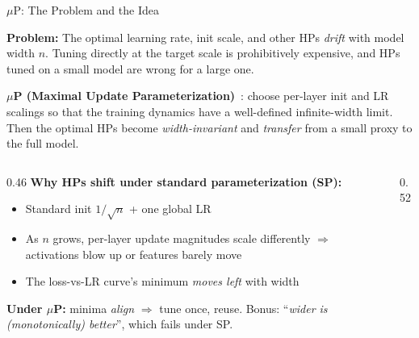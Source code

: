 \begin{frame}{$\mu$P: The Problem and the Idea}

  \textbf{Problem:} The optimal learning rate, init scale, and other HPs \emph{drift} with model width $n$. Tuning directly at the target scale is prohibitively expensive, and HPs tuned on a small model are wrong for a large one.

  \vspace{0.2em}
  \textbf{$\mu$P (Maximal Update Parameterization)}~\cite{yang2022muP}: choose per-layer init and LR scalings so that the training dynamics have a well-defined infinite-width limit. Then the optimal HPs become \emph{width-invariant} and \emph{transfer} from a small proxy to the full model.

  \vspace{0.3em}
  \begin{columns}[T]
    \begin{column}{0.46\textwidth}
      \textbf{Why HPs shift under standard parameterization (SP):}
      \begin{itemize}
        \item Standard init $1/\sqrt{n}$ + one global LR
        \item As $n$ grows, per-layer update magnitudes scale differently $\Rightarrow$ activations blow up or features barely move
        \item The loss-vs-LR curve's minimum \emph{moves left} with width
      \end{itemize}
      \textbf{Under $\mu$P:} minima \emph{align} $\Rightarrow$ tune once, reuse. Bonus: ``\emph{wider is (monotonically) better}'', which fails under SP.
    \end{column}
    \begin{column}{0.52\textwidth}
      \begin{center}
\end{center}
\end{column}
\end{columns}
\end{frame}
